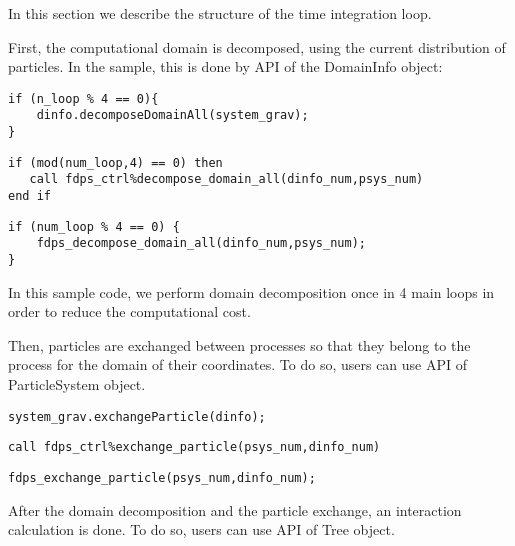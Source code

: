 In this section we describe the structure of the time integration loop.


First, the computational domain is decomposed, using the current distribution of particles. In the sample, this is done by API  of the \textsf{DomainInfo} object:

\ifCpp %
\begin{lstlisting}[caption=Domain Decomposition]
if (n_loop % 4 == 0){
    dinfo.decomposeDomainAll(system_grav);
}
\end{lstlisting}
\endifCpp
\ifFtn %
\begin{lstlisting}[caption=Domain Decomposition]
if (mod(num_loop,4) == 0) then
   call fdps_ctrl%decompose_domain_all(dinfo_num,psys_num)
end if
\end{lstlisting}
\endifFtn
\ifC %
\begin{lstlisting}[caption=Domain Decomposition]
if (num_loop % 4 == 0) {
    fdps_decompose_domain_all(dinfo_num,psys_num);
}
\end{lstlisting}
\endifC

In this sample code, we perform domain decomposition once in 4 main loops in order to reduce the computational cost.


Then, particles are exchanged between processes so that they belong to the process for the domain of their coordinates. To do so, users can use API  of \textsf{ParticleSystem} object.

\ifCpp %
\begin{lstlisting}[caption=Particle Exchange]
system_grav.exchangeParticle(dinfo);
\end{lstlisting}
\endifCpp
\ifFtn %
\begin{lstlisting}[caption=Particle Exchange]
call fdps_ctrl%exchange_particle(psys_num,dinfo_num)
\end{lstlisting}
\endifFtn
\ifC %
\begin{lstlisting}[caption=Particle Exchange]
fdps_exchange_particle(psys_num,dinfo_num);
\end{lstlisting}
\endifC


After the domain decomposition and the particle exchange, an interaction calculation is done. To do so, users can use API  of \textsf{Tree} object.

